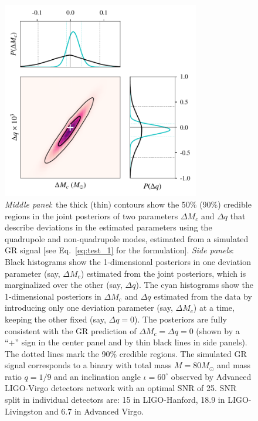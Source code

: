 \documentclass[prd,preprintnumbers,twocolumn,eqsecnum,floatfix,a4paper,nofootinbib,superscriptaddress]{revtex4}
\begin{document}
\begin{figure}[tb] \begin{center}
		\includegraphics[width=3.4in]{figs/hm_mcq_GR.pdf}
		\caption{\emph{Middle panel}: the thick (thin) contours show the 50\% (90\%) credible regions in the joint posteriors of two parameters $\Delta M_c$ and $\Delta q$ that describe deviations in the estimated parameters using the quadrupole and non-quadrupole modes, estimated from a simulated GR signal [see Eq.~\eqref{eq:test_1} for the formulation]. \emph{Side panels}: Black histograms show the 1-dimensional posteriors in one deviation parameter (say, $\Delta M_c$) estimated from the joint posteriors, which is marginalized over the other (say, $\Delta q$). The cyan histograms show the 1-dimensional posteriors in $\Delta M_c$ and $\Delta q$ estimated from the data by introducing only one deviation parameter (say, $\Delta M_c$) at a time, keeping the other fixed (say, $\Delta q = 0$). The posteriors are fully consistent with the GR prediction of $\Delta M_c = \Delta q = 0$ (shown by a ``+'' sign in the center panel and by thin black lines in side panels). The dotted lines mark the 90\% credible regions. The simulated GR signal corresponds to a binary with total mass $M = {80}M_\odot$ and mass ratio $q = 1/9$ and an inclination angle $\iota = {60^\circ}$ observed by Advanced LIGO-Virgo detectors network with an optimal SNR of 25. SNR split in individual detectors are: 15 in LIGO-Hanford, 18.9 in LIGO-Livingston and 6.7 in Advanced Virgo.}
		\label{fig:posterior_BBH_GR_inj}
\end{center} \end{figure}
\end{document}
